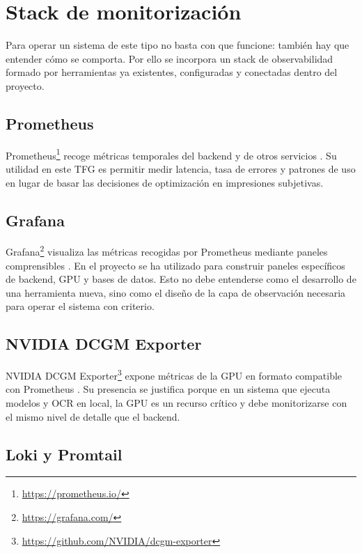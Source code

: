 \section{Stack de monitorización}
\label{sec:stack-monitorizacion}

Para operar un sistema de este tipo no basta con que funcione: también hay que entender cómo se comporta. Por ello se incorpora un stack de observabilidad formado por herramientas ya existentes, configuradas y conectadas dentro del proyecto.

\subsection{Prometheus}

Prometheus\footnote{\url{https://prometheus.io/}} recoge métricas temporales del backend y de otros servicios \cite{prometheus2026docs}. Su utilidad en este TFG es permitir medir latencia, tasa de errores y patrones de uso en lugar de basar las decisiones de optimización en impresiones subjetivas.

\subsection{Grafana}

Grafana\footnote{\url{https://grafana.com/}} visualiza las métricas recogidas por Prometheus mediante paneles comprensibles \cite{grafana2026docs}. En el proyecto se ha utilizado para construir paneles específicos de backend, GPU y bases de datos. Esto no debe entenderse como el desarrollo de una herramienta nueva, sino como el diseño de la capa de observación necesaria para operar el sistema con criterio.

\subsection{NVIDIA DCGM Exporter}

NVIDIA DCGM Exporter\footnote{\url{https://github.com/NVIDIA/dcgm-exporter}} expone métricas de la GPU en formato compatible con Prometheus \cite{dcgmExporter2026docs}. Su presencia se justifica porque en un sistema que ejecuta modelos y OCR en local, la GPU es un recurso crítico y debe monitorizarse con el mismo nivel de detalle que el backend.

\subsection{Loki y Promtail}

